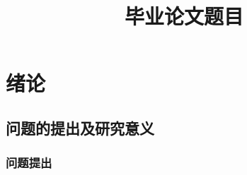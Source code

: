 \documentclass{HHUBachelorThesis}
\title{毕业论文题目}
\begin{document}
\ChineseCover
\EnglishCover
\AcademicStatement
\AbstractzhPage
\AbstractenPage
\ToCPage

\section{绪论}
\subsection{问题的提出及研究意义}
\subsubsection{问题提出}

\clearpage\thispagestyle{empty}

\end{document}
